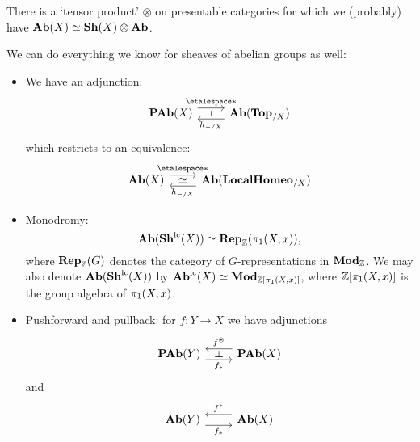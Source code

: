 \documentclass[../main.tex]{subfiles}
\begin{document}
\begin{rmk}
There is a `tensor product' \(\otimes\) on presentable categories for which we (probably) have \(\operatorname{\mathbf{Ab}}(X)\simeq\operatorname{\mathbf{Sh}}(X)\otimes\mathbf{Ab}\).
\end{rmk}

\begin{rmk}
    We can do everything we know for sheaves of abelian groups as well:
    \begin{itemize}
        \item We have an adjunction:
            \[\begin{tikzcd}
            \catAbelianPresheaf(X) \ar[r, "{\etalespace*}"{name=leftadj}, shift left=2] & \catAbelianGroup(\catTopologicalSpace_{/X}) \ar[l, "h_{-/X}"{name=rightadj}, shift left=2]
            \ar[from=leftadj, to=rightadj, phantom, "\leftadj" rotate=-90]
          \end{tikzcd}\]
         which restricts to an equivalence:
            \[\begin{tikzcd}
            \catAbelianSheaf(X) \ar[r, "{\etalespace*}"{name=leftadj}, shift left=2] & \catAbelianGroup(\catLocalHomeomorphism_{/X}) \ar[l, "h_{-/X}"{name=rightadj}, shift left=2]
            \ar[from=leftadj, to=rightadj, phantom, "\simeq"]
          \end{tikzcd}\]
          \item Monodromy:
            \[\catAbelianGroup(\catLocallyConstantSheaf(X)) \simeq \catName{Rep}_{\bb Z}(\homotopy[1](X,x))\text{,} \]
            where $\mathbf{Rep}_{\mathbb{Z}}(G)$ denotes the category of \(G\)-representations in $\catModule_{\bb Z}$.
            We may also denote $\mathbf{Ab}(\operatorname{\mathbf{Sh}^{\smash{\textup{lc}}}}(X))$ by $\catLocallyConstantAbelianSheaf(X) \simeq \catModule_{\bb Z[\homotopy[1](X,x)]}$, where \(\bb Z[\homotopy[1](X,x)]\) is the group algebra of \(\homotopy[1](X,x)\).
          \item Pushforward and pullback: for $f\colon Y\to X$ we have adjunctions
              \[\begin{tikzcd}
            \catAbelianPresheaf(Y) \ar[r, "f_*"'{name=rightadj}, shift right=2] &
            \catAbelianPresheaf(X) \ar[l, "f^\circledast"'{name=leftadj}, shift right=2]
            \ar[from=leftadj, to=rightadj, phantom, "\leftadj" rotate=-90]
          \end{tikzcd}\]
          and 
              \[\begin{tikzcd}
                \catAbelianSheaf(Y) \ar[r, "f_*"'{name=rightadj}, shift right=2] &
                \catAbelianSheaf(X) \ar[l, "f^*"'{name=leftadj}, shift right=2]

\end{tikzcd}\]
\end{itemize}
\end{rmk}
\end{document}
